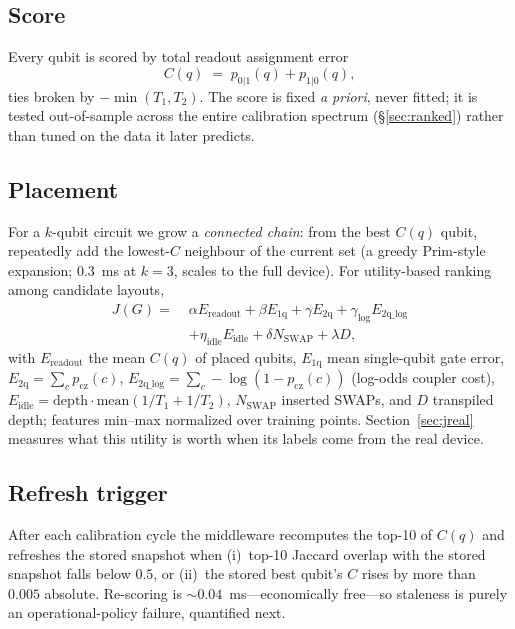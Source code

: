 \documentclass[journal,10pt,twocolumn]{IEEEtran}
\begin{document}
\subsection{Score}
\label{sec:score}
Every qubit is scored by total readout assignment error
\begin{equation}
C(q)\;=\;p_{0|1}(q)+p_{1|0}(q),
\label{eq:cscore}
\end{equation}
ties broken by $-\min(T_1,T_2)$. The score is fixed \emph{a priori}, never fitted; it is tested out-of-sample
across the entire calibration spectrum (\S\ref{sec:ranked}) rather than tuned on the data it later predicts.

\subsection{Placement}
For a $k$-qubit circuit we grow a \emph{connected chain}: from the best $C(q)$ qubit, repeatedly add the lowest-$C$
neighbour of the current set (a greedy Prim-style expansion; $0.3$~ms at $k{=}3$, scales to the full device). For
utility-based ranking among candidate layouts,
\begin{equation}
\begin{aligned}
J(G)=\;&\alpha E_{\mathrm{readout}}+\beta E_{\mathrm{1q}}+\gamma E_{\mathrm{2q}}
+\gamma_{\log}E_{\mathrm{2q\_log}}\\
&+\eta_{\mathrm{idle}}E_{\mathrm{idle}}+\delta N_{\mathrm{SWAP}}+\lambda D,
\end{aligned}
\label{eq:j7}
\end{equation}
with $E_{\mathrm{readout}}$ the mean $C(q)$ of placed qubits, $E_{\mathrm{1q}}$ mean single-qubit gate error,
$E_{\mathrm{2q}}=\sum_c p_{\mathrm{cz}}(c)$, $E_{\mathrm{2q\_log}}=\sum_c-\log(1-p_{\mathrm{cz}}(c))$ (log-odds
coupler cost), $E_{\mathrm{idle}}=\mathrm{depth}\cdot\mathrm{mean}(1/T_1+1/T_2)$, $N_{\mathrm{SWAP}}$ inserted
SWAPs, and $D$ transpiled depth; features min--max normalized over training points. Section~\ref{sec:jreal}
measures what this utility is worth when its labels come from the real device.

\subsection{Refresh trigger}
\label{sec:trigger}
After each calibration cycle the middleware recomputes the top-10 of $C(q)$ and refreshes the stored snapshot when
(i)~top-10 Jaccard overlap with the stored snapshot falls below $0.5$, or (ii)~the stored best qubit's $C$ rises by
more than $0.005$ absolute. Re-scoring is $\sim0.04$~ms---economically free---so staleness is purely an
operational-policy failure, quantified next.
\end{document}
